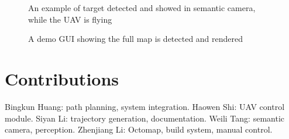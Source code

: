 \documentclass{article}
\begin{document}
    \begin{figure}[h]
        \centering
            \caption{An example of target detected and showed in semantic camera, while the UAV is flying}
            \label{fig:GUI}
    \end{figure}

    \begin{figure}[h]
        \centering
            \caption{A demo GUI showing the full map is detected and rendered}  
            \label{fig:GUI}
    \end{figure}

\section{Contributions}
\begin{outline}
    \1 Bingkun Huang: path planning, system integration.
    \1 Haowen Shi: UAV control module.
    \1 Siyan Li: trajectory generation, documentation.
    \1 Weili Tang: semantic camera, perception.
    \1 Zhenjiang Li: Octomap, build system, manual control.
\end{outline}























\end{document}

